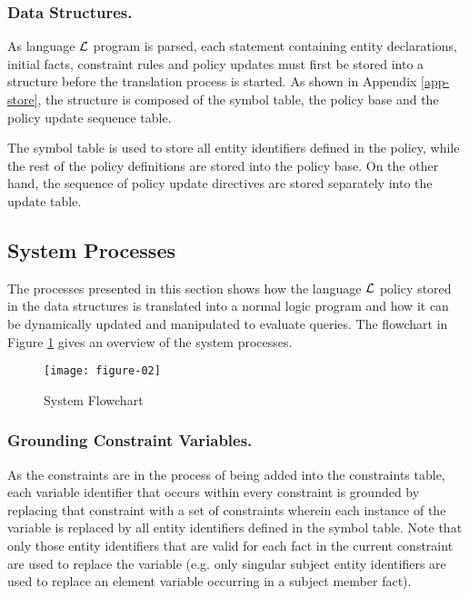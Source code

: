 \documentclass[global,twocolumn,final]{svjour}
\begin{document}
      \subsubsection{Data Structures.}

        As language ${\cal L}$ program is parsed, each statement containing
        entity declarations, initial facts, constraint rules and policy
        updates must first be stored into a structure before the translation
        process is started. As shown in Appendix \ref{app-store}, the structure
        is composed of the symbol table, the policy base and the policy update
        sequence table.

        The symbol table is used to store all entity identifiers defined in the
        policy, while the rest of the policy definitions are stored into the
        policy base. On the other hand, the sequence of policy update
        directives are stored separately into the update table.

    \subsection{System Processes}

      The processes presented in this section shows how the language
      ${\cal L}$ policy stored in the data structures is translated into a
      normal logic program and how it can be dynamically updated and
      manipulated to evaluate queries. The flowchart in Figure \ref{fig-2}
      gives an overview of the system processes.

      \begin{figure}[ht]
        \begin{center}
          \texttt{[image: figure-02]}
          \caption{System Flowchart}
          \label{fig-2}
        \end{center}
      \end{figure}

      \subsubsection{Grounding Constraint Variables.}

        As the constraints are in the process of being added into the
        constraints table, each variable identifier that occurs within
        every constraint is grounded by replacing that constraint with a set of
        constraints wherein each instance of the variable is replaced by all
        entity identifiers defined in the symbol table. Note that only those
        entity identifiers that are valid for each fact in the current
        constraint are used to replace the variable (e.g. only singular
        subject entity identifiers are used to replace an element variable
        occurring in a subject member fact).
\end{document}
